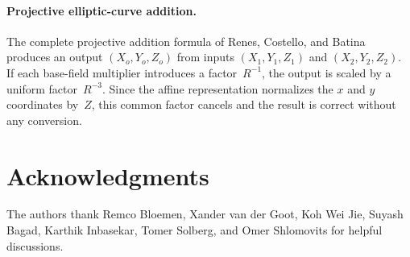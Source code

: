 \documentclass[reqno]{amsart}
\theoremstyle{definition}
\begin{document}
\paragraph{Projective elliptic-curve addition.}
The complete projective addition formula of Renes, Costello, and Batina~\cite{renes2016complete} produces an output $(X_o,Y_o,Z_o)$ from inputs $(X_1,Y_1,Z_1)$ and $(X_2,Y_2,Z_2)$.
If each base-field multiplier introduces a factor~$R^{-1}$, the output is scaled by a uniform factor~$R^{-3}$.
Since the affine representation normalizes the $x$ and $y$ coordinates by~$Z$, this common factor cancels and the result is correct without any conversion.

\section*{Acknowledgments}

The authors thank Remco Bloemen, Xander van der Goot, Koh Wei Jie, Suyash Bagad, Karthik Inbasekar, Tomer Solberg, and Omer Shlomovits for helpful discussions.



\end{document}
